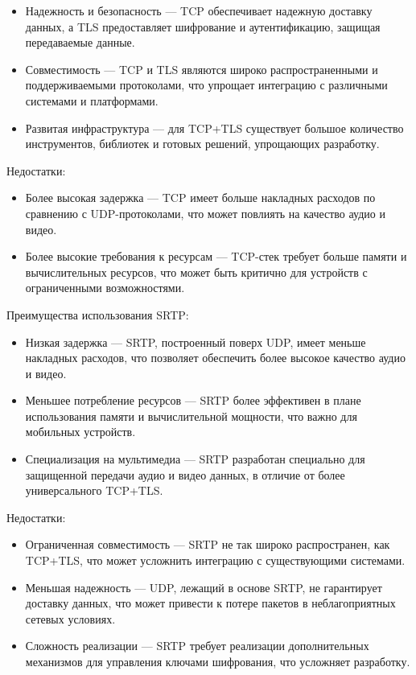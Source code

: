 \begin{itemize}[label=---]
  \item Надежность и безопасность --- TCP обеспечивает надежную доставку данных, а TLS предоставляет шифрование и аутентификацию, защищая передаваемые данные.
  \item Совместимость --- TCP и TLS являются широко распространенными и поддерживаемыми протоколами, что упрощает интеграцию с различными системами и платформами.
  \item Развитая инфраструктура --- для TCP+TLS существует большое количество инструментов, библиотек и готовых решений, упрощающих разработку.
\end{itemize}

Недостатки:

\begin{itemize}[label=---]
  \item Более высокая задержка --- TCP имеет больше накладных расходов по сравнению с UDP-протоколами, что может повлиять на качество аудио и видео.
  \item Более высокие требования к ресурсам --- TCP-стек требует больше памяти и вычислительных ресурсов, что может быть критично для устройств с ограниченными возможностями.
\end{itemize}

Преимущества использования SRTP:

\begin{itemize}[label=---]
  \item Низкая задержка --- SRTP, построенный поверх UDP, имеет меньше накладных расходов, что позволяет обеспечить более высокое качество аудио и видео.
  \item Меньшее потребление ресурсов --- SRTP более эффективен в плане использования памяти и вычислительной мощности, что важно для мобильных устройств.
  \item Специализация на мультимедиа --- SRTP разработан специально для защищенной передачи аудио и видео данных, в отличие от более универсального TCP+TLS.
\end{itemize}
  
Недостатки:

\begin{itemize}[label=---]
  \item Ограниченная совместимость --- SRTP не так широко распространен, как TCP+TLS, что может усложнить интеграцию с существующими системами.
  \item Меньшая надежность --- UDP, лежащий в основе SRTP, не гарантирует доставку данных, что может привести к потере пакетов в неблагоприятных сетевых условиях.
  \item Сложность реализации --- SRTP требует реализации дополнительных механизмов для управления ключами шифрования, что усложняет разработку.
\end{itemize}

